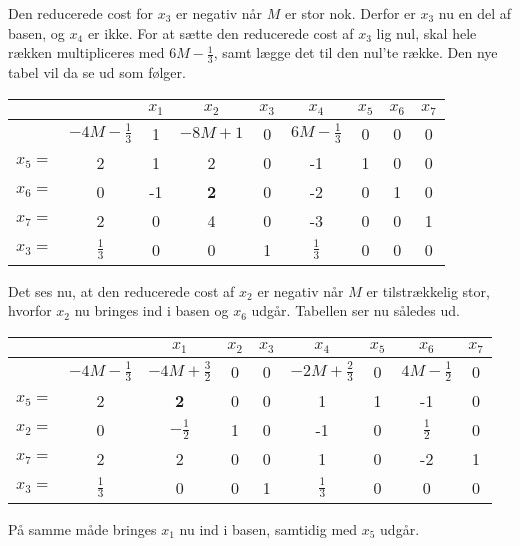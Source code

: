 \begin{eks}
Den reducerede cost for $x_3$ er negativ når $M$ er stor nok. 
Derfor er $x_3$ nu en del af basen, og $x_4$ er ikke. 
For at sætte den reducerede cost af $x_3$ lig nul, skal hele rækken multipliceres med $6M- \frac{1}{3}$, samt lægge det til den nul'te række. 
Den nye tabel vil da se ud som følger.

\begin{center}
\begin{tabular}{|c|c|ccccccc|}
\hline
	 &  & $x_1$ & $x_2$ & $x_3$ & $x_4$ & $x_5$ & $x_6$ & $x_7$ \\
\hline
	 & $-4M- \frac{1}{3}$ & 1 & $-8M+1$ & 0 & $6M- \frac{1}{3}$ & 0 & 0 & 0 \\
\hline
	$x_5=$ & 2 	  & 1  & 2		    & 0 & -1 & 1 & 0 & 0 \\
	$x_6=$ & 0 	  & -1 & \textbf{2} & 0 & -2 & 0 & 1 & 0 \\
	$x_7=$ & 2	  & 0  & 4 		 & 0 & -3 & 0 & 0 & 1 \\
	$x_3=$ & $\frac{1}{3}$ & 0 	 & 0 & 1  & $\frac{1}{3}$ & 0 & 0 & 0 \\
\hline
\end{tabular}
\end{center}

Det ses nu, at den reducerede cost af $x_2$ er negativ når $M$ er tilstrækkelig stor, hvorfor $x_2$ nu bringes ind i basen og $x_6$ udgår. 
Tabellen ser nu således ud.

\begin{center}
\begin{tabular}{|c|c|ccccccc|}
\hline
	 &  & $x_1$ & $x_2$ & $x_3$ & $x_4$ & $x_5$ & $x_6$ & $x_7$ \\
\hline
	 & $-4M- \frac{1}{3}$ & $-4M+ \frac{3}{2}$ & 0 & 0 & $-2M+ \frac{2}{3}$ & 0 & $4M- \frac{1}{2}$ & 0 \\
\hline
	$x_5=$ & 2 & \textbf{2} & 0 & 0 & 1 & 1 & -1 & 0 \\
	$x_2=$ & 0 & $- \frac{1}{2}$ & 1 & 0 & -1 & 0 & $\frac{1}{2}$ & 0 \\
	$x_7=$ & 2 & 2 & 0 & 0 & 1 & 0 & -2 & 1 \\
	$x_3=$ & $\frac{1}{3}$ & 0 & 0 & 1 & $\frac{1}{3}$ & 0 & 0 & 0 \\
\hline
\end{tabular}
\end{center}

På samme måde bringes $x_1$ nu ind i basen, samtidig med $x_5$ udgår. 


\end{eks}
